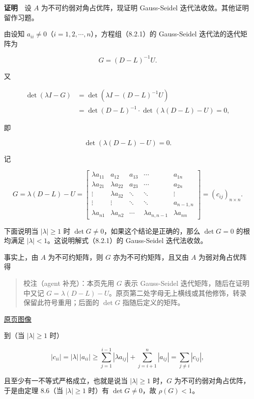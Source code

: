 \documentclass[
  10pt,
  fontset=fandol]{ctexart}
\begin{document}
\textbf{证明}　设 \(A\) 为不可约弱对角占优阵，现证明 Gauss-Seidel 迭代法收敛。其他证明留作习题。

由设知 \(a_{ii}\neq0\)（\(i=1,2,\cdots,n\)），方程组（8.2.1）的 Gauss-Seidel 迭代法的迭代矩阵为

\[
G=(D-L)^{-1}U.
\]

又

\[
\begin{aligned}
\det(\lambda I-G)&=\det(\lambda I-(D-L)^{-1}U)\\
&=\det(D-L)^{-1}\cdot\det(\lambda(D-L)-U)=0,
\end{aligned}
\]

即

\[
\det(\lambda(D-L)-U)=0.
\]

记

\[
G=\lambda(D-L)-U=\begin{bmatrix}
\lambda a_{11}&a_{12}&a_{13}&\cdots&a_{1n}\\
\lambda a_{21}&\lambda a_{22}&a_{23}&\cdots&a_{2n}\\
\vdots&\lambda a_{32}&\ddots&\ddots&\vdots\\
\vdots&\vdots&\ddots&\ddots&a_{n-1,n}\\
\lambda a_{n1}&\lambda a_{n2}&\cdots&\lambda a_{n,n-1}&\lambda a_{nn}
\end{bmatrix}=(c_{ij})_{n\times n}.
\]

下面说明当 \(|\lambda|\geqslant1\) 时 \(\det G\neq0\)，如果这个结论是正确的，那么 \(\det G=0\) 的根均满足 \(|\lambda|<1\)。这说明解式（8.2.1）的 Gauss-Seidel 迭代法收敛。

事实上，由 \(A\) 为不可约矩阵，则 \(G\) 亦为不可约矩阵，且又由 \(A\) 为弱对角占优阵得

\begin{quote}
校注（agent 补充）：本页先用 \(G\) 表示 Gauss-Seidel 迭代矩阵，随后在证明中又记 \(G=\lambda(D-L)-U\)。原页第二处字母无上横线或其他修饰，转录保留此符号重用；后面的 \(\det G\) 指随后定义的矩阵。
\end{quote}

\href{../../source-images/pdf-226.jpeg}{原页图像}

到（当 \(|\lambda|\geqslant1\) 时）

\[
|c_{ii}|=|\lambda|\,|a_{ii}|
\geqslant\sum_{j=1}^{i-1}|\lambda a_{ij}|+\sum_{j=i+1}^n|a_{ij}|
=\sum_{j\neq i}|c_{ij}|,
\]

且至少有一不等式严格成立，也就是说当 \(|\lambda|\geqslant1\) 时，\(G\) 为不可约弱对角占优阵，于是由定理 8.6（当 \(|\lambda|\geqslant1\) 时）有 \(\det G\neq0\)，故 \(\rho(G)<1\)。
\end{document}
